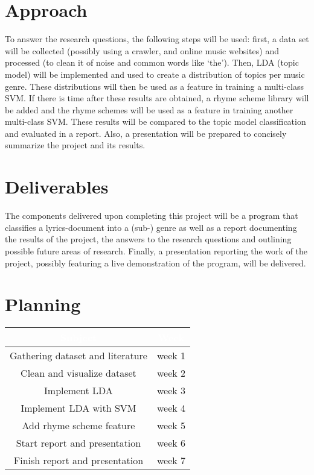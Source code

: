 \documentclass[12pt,a4paper]{amsart}
\begin{document}
\section{Approach}
To answer the research questions, the following steps will be used: first, a data set will be collected (possibly using a crawler, and online music websites) and processed (to clean it of noise and common words like `the'). Then, LDA (topic model) will be implemented and used to create a distribution of topics per music genre. These distributions will then be used as a feature in training a multi-class SVM. If there is time after these results are obtained, a rhyme scheme library will be added and the rhyme schemes will be used as a feature in training another multi-class SVM. These results will be compared to the topic model classification and evaluated in a report. Also, a presentation will be prepared to concisely summarize the project and its results.

\section{Deliverables}
The components delivered upon completing this project will be a program that classifies a lyrics-document into a (sub-) genre as well as a report documenting the results of the project, the answers to the research questions and outlining possible future areas of research. Finally, a  presentation reporting the work of the project, possibly featuring a live demonstration of the program, will be delivered.
\section{Planning}

\begin{center}
\begin{tabular}{ |c | c |}
\rowcolor{dark-gray}
\hline
\textcolor{white}{\textbf{Subject}} & \textcolor{white}{\textbf{Week}}\\
	\hline
	Gathering dataset and literature & week 1  \\
	\hline
	Clean and visualize dataset & week 2 \\
	\hline
	Implement LDA & week 3 \\
	\hline
	Implement LDA with SVM & week 4 \\
	\hline
	Add rhyme scheme feature & week 5 \\
	\hline
	Start report and presentation & week 6 \\
	\hline
	Finish report and presentation & week 7\\
	\hline
\end{tabular}\\
\end{center}


\end{document}
